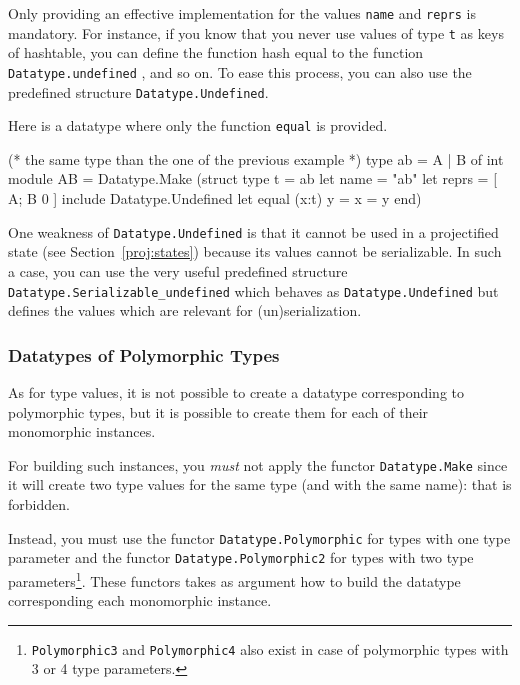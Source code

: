 Only providing an effective implementation for the values \texttt{name} and
\texttt{reprs} is mandatory. For instance, if you know that you never
use values of type \texttt{t} as keys of hashtable, you can define the function
hash equal to the function
\texttt{Datatype.undefined} , and so on. To ease
this process, you can also use the predefined structure
\texttt{Datatype.Undefined}.
\begin{example}
  Here is a datatype where only the function \texttt{equal} is provided.
\begin{ocamlcode}
(* the same type than the one of the previous example *)
type ab = A | B of int
module AB =
  Datatype.Make
    (struct
       type t = ab
       let name = "ab"
       let reprs = [ A; B 0 ]
       include Datatype.Undefined
       let equal (x:t) y = x = y
    end)
\end{ocamlcode}
\end{example}

One weakness of \texttt{Datatype.Undefined} is that it cannot be used in a
projectified state (see Section~\ref{proj:states}) because its values cannot be
serializable. In such a case, you can use the very useful predefined structure
\texttt{Datatype.Serializable\_undefined}%
 which behaves as
\texttt{Datatype.Undefined} but defines the values which are relevant for
(un)serialization.

\subsubsection{Datatypes of Polymorphic Types}

As for type values, it is not possible to create a datatype corresponding to
polymorphic types, but it is possible to create them for each of their
monomorphic instances.

\begin{important}
For building such instances, you \emph{must} not apply the functor
\texttt{Datatype.Make} since it will create two type
values for the same type (and with the same name): that is forbidden.
\end{important}

Instead, you must use the functor
\texttt{Datatype.Polymorphic} for types with one
type parameter and the functor
\texttt{Datatype.Polymorphic2} for types with
two type parameters\footnote{%
\texttt{Polymorphic3} and
\texttt{Polymorphic4}
also exist in case of polymorphic types with 3 or 4 type parameters.}.
These functors takes as argument how to build the datatype
corresponding each monomorphic instance.

